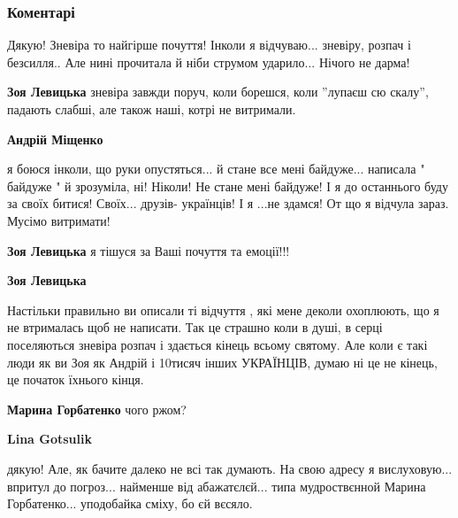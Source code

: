  
 
 
 
 
\subsubsection{Коментарі}

\begin{itemize} %

Дякую! Зневіра то найгірше почуття! Інколи я відчуваю... зневіру, розпач і
безсилля.. Але нині прочитала й ніби струмом ударило... Нічого не дарма!

\begin{itemize} %
\textbf{Зоя Левицька} зневіра завжди поруч, коли борешся, коли ''лупаєш сю скалу'', падають слабші, але також наші, котрі не витримали.

\textbf{Андрій Міщенко} 

я боюся інколи, що руки опустяться... й стане все мені байдуже... написала "
байдуже " й зрозуміла, ні! Ніколи! Не стане мені байдуже! І я до останнього
буду за своїх битися! Своїх... друзів- українців! І я ...не здамся! От що я
відчула зараз. Мусімо витримати!


\textbf{Зоя Левицька} я тішуся за Ваші почуття та емоції!!!

\textbf{Зоя Левицька}

Настільки правильно ви описали ті відчуття , які мене деколи охоплюють, що я не
втрималась щоб не написати. Так це страшно коли в душі, в серці поселяються
зневіра розпач і здається кінець всьому святому. Але коли є такі люди як ви Зоя
як Андрій і 10тисяч інших УКРАЇНЦІВ, думаю ні це не кінець, це початок їхнього
кінця.

\textbf{Марина Горбатенко} чого ржом?

\textbf{Lina Gotsulik} 

дякую! Але, як бачите далеко не всі так думають. На свою адресу я
вислуховую... впритул до погроз... найменше від абажатєлєй... типа мудроствєнной
Марина Горбатенко... уподобайка сміху, бо єй вєсяло.


\end{itemize}
\end{itemize}
